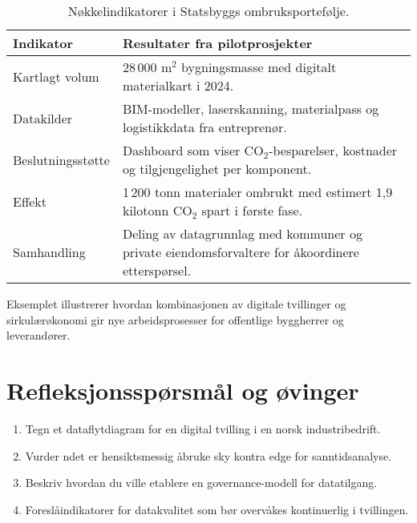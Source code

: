 \begin{table}[ht]
    \centering
    \caption{N\o kkelindikatorer i Statsbyggs ombruksportef\o lje.}
    \label{tab:kap03-loopfront}
    \begin{tabular}{p{}p{}}
        \toprule
        \textbf{Indikator} & \textbf{Resultater fra pilotprosjekter} \\
        \midrule
        Kartlagt volum & 28\,000 m$^2$ bygningsmasse med digitalt materialkart i 2024. \\
        Datakilder & BIM-modeller, laserskanning, materialpass og logistikkdata fra entrepren\o r. \\
        Beslutningsst\o tte & Dashboard som viser CO$_2$-besparelser, kostnader og tilgjengelighet per komponent. \\
        Effekt & 1\,200 tonn materialer ombrukt med estimert 1,9 kilotonn CO$_2$ spart i f\o rste fase. \\
        Samhandling & Deling av datagrunnlag med kommuner og private eiendomsforvaltere for \aa koordinere ettersp\o rsel. \\
        \bottomrule
    \end{tabular}
\end{table}

Eksemplet illustrerer hvordan kombinasjonen av digitale tvillinger og sirkul\ae r\o konomi gir nye arbeidsprosesser for offentlige byggherrer og leverand\o rer.

\section{Refleksjonssp\o rsm\aa l og \o vinger}
\begin{enumerate}
    \item Tegn et dataflytdiagram for en digital tvilling i en norsk industribedrift.
    \item Vurder n\aar det er hensiktsmessig \aa bruke sky kontra edge for sanntidsanalyse.
    \item Beskriv hvordan du ville etablere en governance-modell for datatilgang.
    \item Foresl\aa indikatorer for datakvalitet som b\o r overv\aa kes kontinuerlig i tvillingen.
\end{enumerate}
